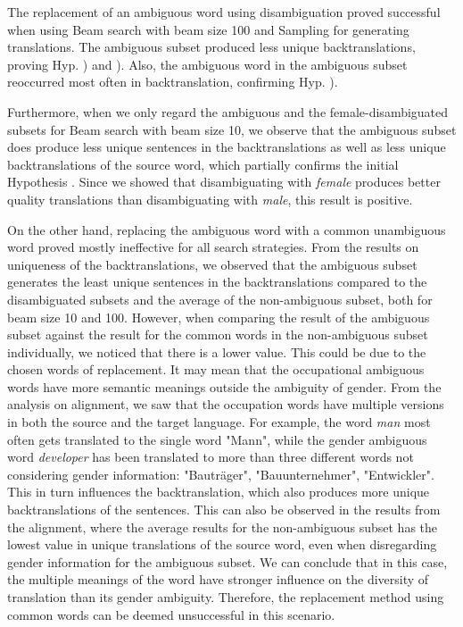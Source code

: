 The replacement of an ambiguous word using disambiguation proved successful when using Beam search with beam size 100 and Sampling for generating translations. The ambiguous subset produced less unique backtranslations, proving Hyp. ) and ). Also, the ambiguous word in the ambiguous subset reoccurred most often in backtranslation, confirming Hyp. ).

Furthermore, when we only regard the ambiguous and the female-disambiguated subsets for Beam search 
with beam size 10, we observe that the ambiguous subset does produce less unique sentences in the backtranslations as well as less unique backtranslations of the source word, which partially confirms the initial Hypothesis . Since we showed that disambiguating with \textit{female} produces better quality translations than disambiguating with \textit{male}, this result is positive.

On the other hand, replacing the ambiguous word with a common unambiguous word proved mostly ineffective for all search strategies. From the results on uniqueness of the backtranslations, we observed that the ambiguous subset generates the least unique sentences in the backtranslations compared to the disambiguated subsets and the average of the non-ambiguous subset, both for beam size 10 and 100. However, when comparing the result of the ambiguous subset against the result for the common words in the non-ambiguous subset individually, we noticed that there is a lower value. This could be due to the chosen words of replacement. It may mean that the occupational ambiguous words have more semantic meanings outside the ambiguity of gender. From the analysis on alignment, we saw that the occupation words have multiple versions in both the source and the target language. For example, the word \textit{man} most often gets translated to the single word "Mann", while the gender ambiguous word \textit{developer} has been translated to more than three different words not considering gender information: "Bauträger", "Bauunternehmer", "Entwickler". This in turn influences the backtranslation, which also produces more unique backtranslations of the sentences. This can also be observed in the results from the alignment, where the average results for the non-ambiguous subset has the lowest value in unique translations of the source word, even when disregarding gender information for the ambiguous subset. We can conclude that in this case, the multiple meanings of the word have stronger influence on the diversity of translation than its gender ambiguity. Therefore, the replacement method using common words can be deemed unsuccessful in this scenario.

